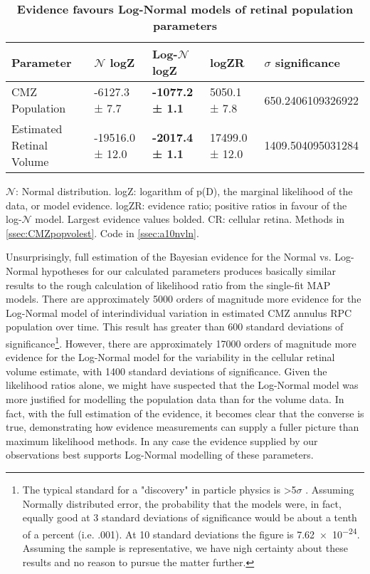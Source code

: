 \begin{table}[!ht]
    \centering
    \caption{
    {\bf Evidence favours Log-Normal models of retinal population parameters}}
    \begin{tabular}{|l|l|l|l|l|}
    \hline
    {\bf Parameter} & {\bf $\mathcal{N}$ logZ} & {\bf Log-$\mathcal{N}$ logZ} & {\bf logZR} & {\bf $\sigma$ significance}\\ \hline
    CMZ Population & -6127.3 ± 7.7 & {\bf -1077.2 ± 1.1} & 5050.1 ± 7.8 & 650.2406109326922\\ \hline
    Estimated Retinal Volume & -19516.0 ± 12.0 & {\bf -2017.4 ± 1.1} & 17499.0 ± 12.0 & 1409.504095031284\\ \hline
    \end{tabular}
    \begin{flushleft} $\mathcal{N}$: Normal distribution. logZ: logarithm of p(D), the marginal likelihood of the data, or model evidence. logZR: evidence ratio; positive ratios in favour of the log-$\mathcal{N}$ model. Largest evidence values bolded. CR: cellular retina.
        Methods in \autoref{ssec:CMZpopvolest}.
        Code in \autoref{ssec:a10nvln}.
    \end{flushleft}
    \label{PZRtable}
\end{table}

Unsurprisingly, full estimation of the Bayesian evidence for the Normal vs. Log-Normal hypotheses for our calculated parameters produces basically similar results to the rough calculation of likelihood ratio from the single-fit MAP models. There are approximately 5000 orders of magnitude more evidence for the Log-Normal model of interindividual variation in estimated CMZ annulus RPC population over time. This result has greater than 600 standard deviations of significance\footnote{The typical standard for a "discovery" in particle physics is >5$\sigma$ \cite{Lyons2013}. Assuming Normally distributed error, the probability that the models were, in fact, equally good at 3 standard deviations of significance would be about a tenth of a percent (i.e. .001). At 10 standard deviations the figure is \num{7.62e-24}. Assuming the sample is representative, we have nigh certainty about these results and no reason to pursue the matter further.}. However, there are approximately 17000 orders of magnitude more evidence for the Log-Normal model for the variability in the cellular retinal volume estimate, with 1400 standard deviations of significance. Given the likelihood ratios alone, we might have suspected that the Log-Normal model was more justified for modelling the population data than for the volume data. In fact, with the full estimation of the evidence, it becomes clear that the converse is true, demonstrating how evidence measurements can supply a fuller picture than maximum likelihood methods. In any case the evidence supplied by our observations best supports Log-Normal modelling of these parameters.

